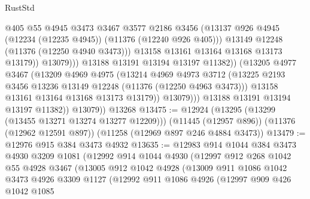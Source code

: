 \begin{lexlean}{RustStd}
\begin{coremodule}
{{{{{{{{{{{{{{{{{{{                                @405
                                @55
                                @4945
                                @3473
                                @3467
                                @3577
                                @2186
                                @3456
                                (@13137
                                  @926
                                  @4945
                                  (@12234 (@12235 @4945))
                                  (@11376 (@12240 @926 @405)))
                                @13149
                                @12248
                                (@11376 (@12250 @4940 @3473)))
                              @13158
                              @13161
                              @13164
                              @13168
                              @13173
                              @13179))
                          @13079)))
                    @13188
                    @13191
                    @13194
                    @13197
                    @11382))
                (@13205
                  @4977
                  @3467
                  (@13209
                    @4969
                    @4975
                    (@13214
                      @4969
                      @4973
                      @3712
                      (@13225 @2193 @3456 @13236 @13149 @12248 (@11376 (@12250 @4963 @3473)))
                      @13158
                      @13161
                      @13164
                      @13168
                      @13173
                      @13179))
                  @13079)))
            @13188
            @13191
            @13194
            @13197
            @11382))
        @13079))
    @13268
@13475 := @12924
    (@13295 (@13299 (@13455 @13271 @13274 @13277 @12209)))
    (@11445 (@12957 @896))
    (@11376 (@12962 @12591 @897))
    (@11258 (@12969 @897 @246 @4884 @3473))
@13479 := @12976 @915 @384 @3473 @4932
@13635 := @12983
    @914
    @1044
    @384
    @3473
    @4930
    @3209
    @1081
    (@12992
      @914
      @1044
      @4930
      (@12997
        @912
        @268
        @1042
        @55
        @4928
        @3467
        (@13005
          @912
          @1042
          @4928
          (@13009
            @911
            @1086
            @1042
            @3473
            @4926
            @3309
            @1127
            (@12992
              @911
              @1086
              @4926
              (@12997
                @909
                @426
                @1042
                @1085
}}}}}}}}}}}}}}}}}}}
\end{coremodule}
\end{lexlean}
